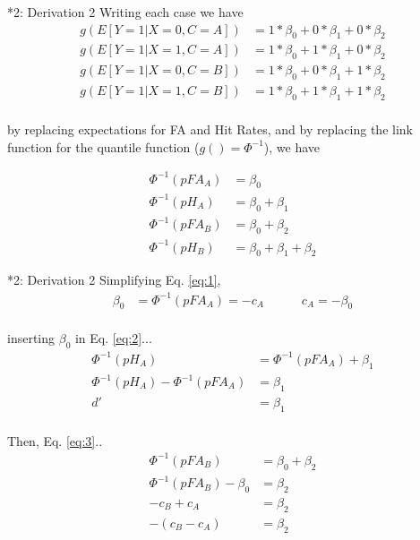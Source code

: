 \documentclass[10pt]{beamer}
\begin{document}
\begin{frame}{*2: Derivation 2}
Writing each case we have 
\begin{align*}
g(E[Y=1| X=0, C=A]) & = 1* \beta_0 + 0 * \beta_1 + 0* \beta_2 \\
g(E[Y=1| X=1, C=A]) & = 1* \beta_0 + 1 * \beta_1 + 0* \beta_2 \\
g(E[Y=1| X=0, C=B]) & = 1* \beta_0 + 0 * \beta_1 + 1* \beta_2 \\
g(E[Y=1| X=1, C=B]) & = 1* \beta_0 + 1 * \beta_1 + 1* \beta_2 \\
\end{align*}

by replacing expectations for FA and Hit Rates, and by replacing the link function for the quantile function ($g() = \Phi^{-1}$), we have

\begin{align}
\Phi^{-1}(pFA_{A}) & = \beta_0 \label{eq:1}\\
\Phi^{-1}(pH_{A}) & = \beta_0 + \beta_1 \label{eq:2}\\
\Phi^{-1}(pFA_{B}) & = \beta_0 + \beta_2  \label{eq:3}\\
\Phi^{-1}(pH_{B}) & = \beta_0 + \beta_1 + \beta_2 \label{eq:4}
\end{align}
\end{frame}

\begin{frame}{*2: Derivation 2}
Simplifying Eq. \autoref{eq:1}, 
\begin{align*}
\beta_0 & = \Phi^{-1}(pFA_{A}) = -c_A \quad \quad \quad c_A = -\beta_0\\
\end{align*}

inserting $\beta_0$ in Eq. \autoref{eq:2}...
\begin{align*}
\Phi^{-1}(pH_{A}) & = \Phi^{-1}(pFA_{A}) + \beta_1\\
\Phi^{-1}(pH_{A}) - \Phi^{-1}(pFA_{A}) & =  \beta_1\\
d' & = \beta_1 \\
\end{align*}

Then, Eq. \autoref{eq:3}..
\begin{align*}
\Phi^{-1}(pFA_{B}) & = \beta_0  + \beta_2 \\
\Phi^{-1}(pFA_{B}) - \beta_0 & =  \beta_2 \\
- c_B + c_A & =  \beta_2 \\
- (c_B - c_A) & =  \beta_2 \\
\end{align*}
\end{frame}
\end{document}
